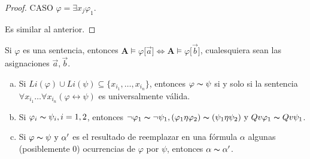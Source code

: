 \begin{proof}
    CASO $\varphi =\exists x_{j}\varphi_{1}$.

    Es similar al anterior.
  \end{proof}

  \begin{corollary} \label{corollary_46}
    \PN Si $\varphi$ es una sentencia, entonces $\mathbf{A} \models \varphi \lbrack \vec{a}] \Leftrightarrow \mathbf{A}
    \models \varphi \lbrack \vec{b}]$, cualesquiera sean las asignaciones $\vec{a}, \vec{b}$.
  \end{corollary}

  \begin{lemma} \label{lemma_47}
    \PN \newline
    \begin{enumerate}[(a)]
      \item Si $Li(\varphi) \cup Li(\psi) \subseteq \{x_{i_{1}}, \dotsc, x_{i_{n}}\}$, entonces $\varphi \thicksim \psi$
      si y solo si la sentencia $\forall x_{i_{1}} \dotsc \forall x_{i_{n}}(\varphi \leftrightarrow \psi)$ es
      universalmente válida.
      \item Si $\varphi_{i} \thicksim \psi_{i}, i = 1, 2$, entonces $\lnot \varphi_{1} \thicksim \lnot \psi_{1},
      (\varphi_{1} \eta \varphi_{2}) \thicksim (\psi_{1} \eta \psi_{2}) \ \text{y} \ Qv\varphi_{1} \thicksim Qv \psi_{1}$.
      \item Si $\varphi \thicksim \psi \ \text{y} \ \alpha^{\prime}$ es el resultado de reemplazar en una fórmula $\alpha$
      algunas (posiblemente $0$) ocurrencias de $\varphi$ por $\psi$, entonces $\alpha \thicksim \alpha^{\prime}$.
    \end{enumerate}
  \end{lemma}

